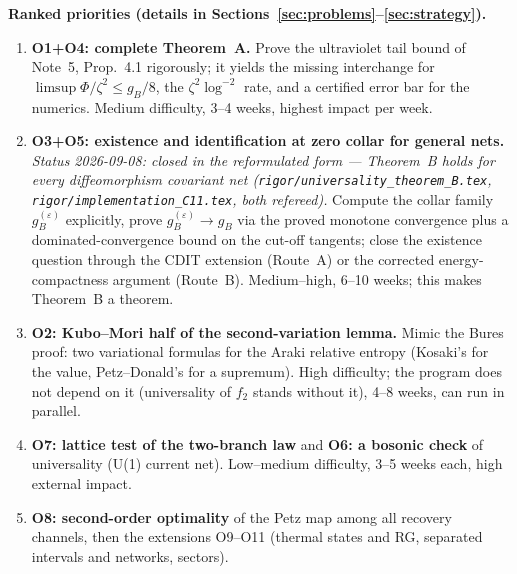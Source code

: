 \documentclass[11pt]{article}
\theoremstyle{accent}
\theoremstyle{definition}
\newcommand{\eps}{\varepsilon}
\begin{document}
\begin{mainbox}
\textbf{Ranked priorities (details in Sections~\ref{sec:problems}--\ref{sec:strategy}).}
\begin{enumerate}[leftmargin=1.6em,itemsep=1pt]
\item \textbf{O1+O4: complete Theorem~A.}  Prove the ultraviolet tail bound of Note~5, Prop.~4.1 rigorously; it yields the missing interchange for \(\limsup\Phi/\zeta^2\le g_B/8\), the \(\zeta^2\log^{-2}\) rate, and a certified error bar for the numerics.  Medium difficulty, 3--4 weeks, highest impact per week.
\item \textbf{O3+O5: existence and identification at zero collar for general nets.}  \emph{Status 2026-09-08: closed in the reformulated form — Theorem~B holds for every diffeomorphism covariant net (\texttt{rigor/universality\_theorem\_B.tex}, \texttt{rigor/implementation\_C11.tex}, both refereed).}  Compute the collar family \(g_B^{(\eps)}\) explicitly, prove \(g_B^{(\eps)}\to g_B\) via the proved monotone convergence plus a dominated-convergence bound on the cut-off tangents; close the existence question through the CDIT extension (Route~A) or the corrected energy-compactness argument (Route~B).  Medium--high, 6--10 weeks; this makes Theorem~B a theorem.
\item \textbf{O2: Kubo--Mori half of the second-variation lemma.}  Mimic the Bures proof: two variational formulas for the Araki relative entropy (Kosaki's for the value, Petz--Donald's for a supremum).  High difficulty; the program does not depend on it (universality of \(f_2\) stands without it), 4--8 weeks, can run in parallel.
\item \textbf{O7: lattice test of the two-branch law} and \textbf{O6: a bosonic check} of universality (U(1) current net).  Low--medium difficulty, 3--5 weeks each, high external impact.
\item \textbf{O8: second-order optimality} of the Petz map among all recovery channels, then the extensions O9--O11 (thermal states and RG, separated intervals and networks, sectors).
\end{enumerate}
\end{mainbox}
\end{document}
